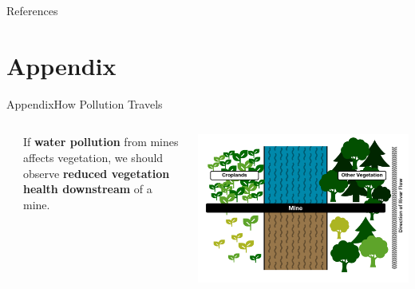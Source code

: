 \documentclass[aspectratio=169,11pt,dvipsnames, handout]{beamer}
\begin{document}

\begin{frame}[allowframebreaks]{References}

\printbibliography

\end{frame}


\appendix
\section{Appendix}



\begin{frame}{\textcolor{defaultclr!30}{Appendix}\hspace{0.75em}How Pollution Travels}
\label{frame:appintro}
    \begin{columns}
    \begin{column}{0.03\linewidth}
        
    \end{column}
        \begin{column}{0.27\linewidth}
            If \textbf{water pollution} from mines affects vegetation, we should observe \textbf{reduced vegetation health \colorbox{downcol!30}{downstream}} of a mine.
            
            \vspace{3em}

            \hyperlink{frame:intro}{}
        \end{column}
        \begin{column}{0.7\linewidth}
            \includegraphics[width=\linewidth]{img/intro.pdf}
        \end{column}
    \end{columns}
\end{frame}
\end{document}
